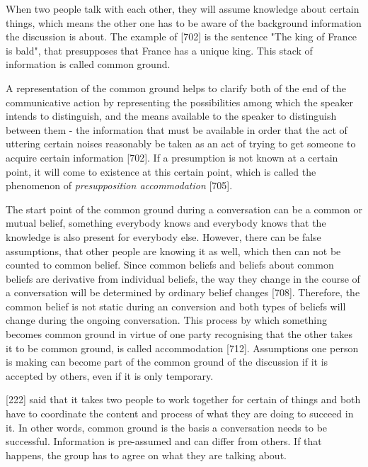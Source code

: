 When two people talk with each other, they will assume knowledge about certain things, which means the other one has to be aware of the background information the discussion is about. The example of \textcite{Stalnaker2002CommonGround}[702] is the sentence "The king of France is bald", that presupposes that France has a unique king. This stack of information is called common ground. 

A representation of the common ground helps to clarify both of the end of the communicative action by representing the possibilities among which the speaker intends to distinguish, and the means available to the speaker to distinguish between them - the information that must be available in order that the act of uttering certain noises reasonably be taken as an act of trying to get someone to acquire certain information \autocite{Stalnaker2002CommonGround}[702].
If a presumption is not known at a certain point, it will come to existence at this certain point, which is called the phenomenon of \textit{presupposition accommodation} \autocite{Stalnaker2002CommonGround}[705].

The start point of the common ground during a conversation can be a common or mutual belief, something everybody knows and everybody knows that the knowledge is also present for everybody else. However, there can be false assumptions, that other people are knowing it as well, which then can not be counted to common belief.
Since common beliefs and beliefs about common beliefs are derivative from individual beliefs, the way they change in the course of a conversation will be determined by ordinary belief changes \autocite{Stalnaker2002CommonGround}[708].
Therefore, the common belief is not static during an conversion and both types of beliefs will change during the ongoing conversation. This process by which something becomes common ground in virtue of one party recognising that the other takes it to be common ground, is called accommodation \autocite{Stalnaker2002CommonGround}[712]. 
Assumptions one person is making can become part of the common ground of the discussion if it is accepted by others, even if it is only temporary.


\textcite{Clark2004GroundingCommunication.}[222] said that it takes two people to work together for certain of things and both have to coordinate the content and process of what they are doing to succeed in it.
In other words, common ground is the basis a conversation needs to be successful. Information is pre-assumed and can differ from others. If that happens, the group has to agree on what they are talking about.  


